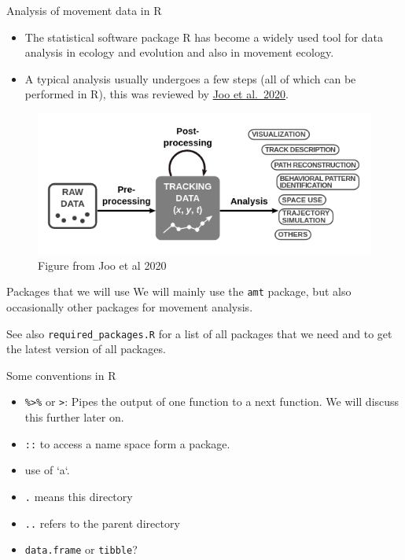 \documentclass[ignorenonframetext,,t]{beamer}
\providecommand{\tightlist}{%
\setlength{\itemsep}{0pt}\setlength{\parskip}{0pt}}
\providecommand{\tightlist}{%
\setlength{\itemsep}{0pt}\setlength{\parskip}{0pt}}
\renewcommand{\tightlist}{\setlength{\itemsep}{1.4ex}\setlength{\parskip}{0pt}}
\begin{document}
\begin{frame}{Analysis of movement data in R}
\protect\hypertarget{analysis-of-movement-data-in-r}{}
\begin{itemize}
\item
  The statistical software package R has become a widely used tool for
  data analysis in ecology and evolution and also in movement ecology.
\item
  A typical analysis usually undergoes a few steps (all of which can be
  performed in R), this was reviewed by
  \href{https://besjournals.onlinelibrary.wiley.com/doi/full/10.1111/1365-2656.13116}{Joo
  et al.~2020}.
\end{itemize}

\begin{figure}

{\centering \includegraphics[width=0.75\linewidth]{img/joo2020} 

}

\caption{Figure from Joo et al 2020}\label{fig:unnamed-chunk-1}
\end{figure}
\end{frame}

\begin{frame}[fragile]
\begin{block}{Packages that we will use}
\protect\hypertarget{packages-that-we-will-use}{}
We will mainly use the \texttt{amt} package, but also occasionally other
packages for movement analysis.

See also \texttt{required\_packages.R} for a list of all packages that
we need and to get the latest version of all packages.
\end{block}
\end{frame}

\begin{frame}[fragile]{Some conventions in R}
\protect\hypertarget{some-conventions-in-r}{}
\begin{itemize}
\tightlist
\item
  \texttt{\%\textgreater{}\%} or \texttt{\textbar{}\textgreater{}}:
  Pipes the output of one function to a next function. We will discuss
  this further later on.
\item
  \texttt{::} to access a name space form a package.
\item
  use of `a`.
\item
  \texttt{.} means this directory
\item
  \texttt{..} refers to the parent directory
\item
  \texttt{data.frame} or \texttt{tibble}?
\end{itemize}
\end{frame}
\end{document}
